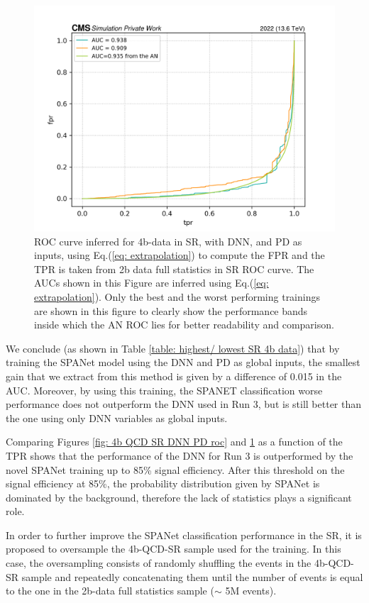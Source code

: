 \begin{figure}[hbt]
    \centering
    \includegraphics[width=0.7\linewidth]{Images/7.S:B/SR stats/4b data DNN.png}
    \caption{ROC curve inferred for 4b-data in SR, with DNN, and PD as inputs, using Eq.(\ref{eq: extrapolation}) to compute the FPR and the TPR is taken from 2b data full statistics in SR ROC curve. The AUCs shown in this Figure are inferred using Eq.(\ref{eq: extrapolation}). Only the best and the worst performing trainings are shown in this figure to clearly show the performance bands inside which the AN ROC lies for better readability and comparison.}
    \label{fig: 4b QCD SR DNN roc}
\end{figure}

We conclude (as shown in Table \ref{table: highest/ lowest SR 4b data}) that by training the SPANet model using the DNN and PD as global inputs, the smallest gain that we extract from this method is given by a difference of 0.015 in the AUC. Moreover, by using this training, the SPANET classification worse performance does not outperform the DNN used in Run 3, but is still better than the one using only DNN variables as global inputs. 

Comparing Figures \ref{fig: 4b QCD SR DNN PD roc} and \ref{fig: 4b QCD SR DNN roc} as a function of the TPR shows that the performance of the DNN for Run 3 is outperformed by the novel SPANet training up to 85\% signal efficiency. After this threshold on the signal efficiency at 85\%, the probability distribution given by SPANet is dominated by the background, therefore the lack of statistics plays a significant role.


In order to further improve the SPANet classification performance in the SR, it is proposed to oversample the 4b-QCD-SR sample used for the training. In this case, the oversampling consists of randomly shuffling the events in the 4b-QCD-SR sample and repeatedly concatenating them until the number of events is equal to the one in the 2b-data full statistics sample ($\sim$ 5M events).

